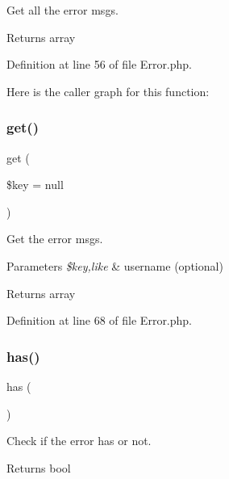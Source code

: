 Get all the error msgs.

\begin{DoxyReturn}{Returns}
array 
\end{DoxyReturn}


Definition at line 56 of file Error.\+php.

Here is the caller graph for this function\+:
\mbox{\label{class_zest_1_1_auth_1_1_error_a35cbcd6b22933128eaaa6ded4e8d9aef}} 
\subsubsection{\texorpdfstring{get()}{get()}}
{\footnotesize\ttfamily get (\begin{DoxyParamCaption}\item[{}]{\$key = {\ttfamily null} }\end{DoxyParamCaption})}

Get the error msgs.


\begin{DoxyParams}{Parameters}
{\em \$key,like} & username (optional)\\
\hline
\end{DoxyParams}
\begin{DoxyReturn}{Returns}
array 
\end{DoxyReturn}


Definition at line 68 of file Error.\+php.

\mbox{\label{class_zest_1_1_auth_1_1_error_a9db60e5b2881ca151b1780e9a4e08560}} 
\subsubsection{\texorpdfstring{has()}{has()}}
{\footnotesize\ttfamily has (\begin{DoxyParamCaption}{ }\end{DoxyParamCaption})}

Check if the error has or not.

\begin{DoxyReturn}{Returns}
bool 
\end{DoxyReturn}


